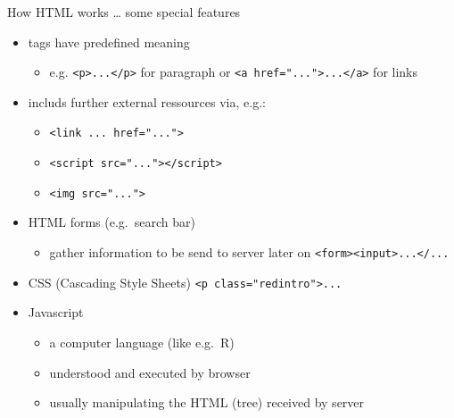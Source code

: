 \documentclass[ignorenonframetext,]{beamer}
\providecommand{\tightlist}{%
  \setlength{\itemsep}{0pt}\setlength{\parskip}{0pt}}
\begin{document}
\begin{frame}[fragile]{How HTML works \ldots{} some special features}

\begin{itemize}
\item
  tags have predefined meaning

  \begin{itemize}
  \tightlist
  \item
    e.g.
    \texttt{\textless{}p\textgreater{}...\textless{}/p\textgreater{}}
    for paragraph or
    \texttt{\textless{}a\ href="..."\textgreater{}...\textless{}/a\textgreater{}}
    for links
  \end{itemize}
\item
  includs further external ressources via, e.g.:

  \begin{itemize}
  \tightlist
  \item
    \texttt{\textless{}link\ ...\ href="..."\textgreater{}}
  \item
    \texttt{\textless{}script\ src="..."\textgreater{}\textless{}/script\textgreater{}}
  \item
    \texttt{\textless{}img\ src="..."\textgreater{}}
  \end{itemize}
\item
  HTML forms (e.g.~search bar)

  \begin{itemize}
  \tightlist
  \item
    gather information to be send to server later on
    \texttt{\textless{}form\textgreater{}\textless{}input\textgreater{}...\textless{}/...}
  \end{itemize}
\item
  CSS (Cascading Style Sheets)
  \texttt{\textless{}p\ class="redintro"\textgreater{}...}
\item
  Javascript

  \begin{itemize}
  \tightlist
  \item
    a computer language (like e.g.~R)
  \item
    understood and executed by browser
  \item
    usually manipulating the HTML (tree) received by server
  \end{itemize}
\end{itemize}

\end{frame}
\end{document}
